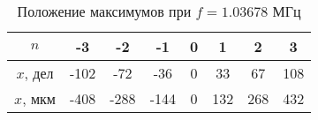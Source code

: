 \begin{table}[h!]
    \centering
    \begin{tabular}{|c|c|c|c|c|c|c|c|}
    \hline
    $n$      & -3   & -2   & -1   & 0 & 1   & 2   & 3   \\ \hline
    $x$, дел & -102 & -72  & -36  & 0 & 33  & 67  & 108 \\ \hline
    $x$, мкм & -408 & -288 & -144 & 0 & 132 & 268 & 432 \\ \hline
    \end{tabular}
    \caption{Положение максимумов при $f = 1.03678$ МГц}
    \label{tab:frequency1}
\end{table}